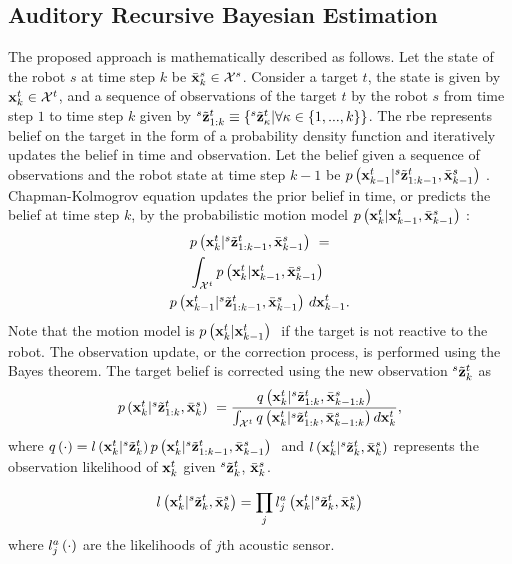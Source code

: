 \documentclass[letterpaper, 10 pt, conference]{ieeeconf}  %
\begin{document}
\subsection{Auditory Recursive Bayesian Estimation}
The proposed approach is mathematically described as follows. Let the state of the robot $s$ at time step $k$ be $\bar {\mathbf{x}}_{k}^{s} \in \mathcal{X}^s$. Consider a target $t$, the state is given by $\mathbf{x}_{k}^{t} \in \mathcal{X}^t$, and a sequence of observations of the target $t$ by the robot $s$ from time step $1$ to time step $k$ given by ${}^{s}\tilde {\mathbf{z}}_{1:k}^{t} \equiv \left \{ {}^{s}\tilde {\mathbf{z}}_{\kappa}^{t}|\forall \kappa \in \left \{ 1,...,k \right \} \right \}$. The \gls{rbe} represents belief on the target in the form of a probability density function and iteratively updates the belief in time and observation.  Let the belief given a sequence of observations and the robot state at time step ${k-1}$ be  $\mbox{$ {p} \left ( \mathbf{x}_{k-1}^{t}|{}^{s}\tilde {\mathbf{z}}_{1:k-1}^{t},\bar {\mathbf{x}}_{k-1}^{s} \right )$ }$.  Chapman-Kolmogrov equation updates the prior belief in time, or predicts the belief at time step $k$, by the probabilistic motion model $\mbox{$ {p} \left ( \mathbf{x}_{k}^{t}|\mathbf{x}_{k-1}^{t},\bar {\mathbf{x}}_{k-1}^{s} \right )$ }$: 
\begin{multline}\label{eq:predictT}
\mbox{$ {p} \left ( \mathbf{x}_{k}^{t}|{}^{s}\tilde {\mathbf{z}}_{1:k-1}^{t},\bar {\mathbf{x}}_{k-1}^{s} \right )$ } =\\ \int_{\mathcal{X}^t} \mbox{$ {p} \left ( \mathbf{x}_{k}^{t}|\mathbf{x}_{k-1}^{t},\bar {\mathbf{x}}_{k-1}^{s} \right )$ } \\  \mbox{$ {p} \left ( \mathbf{x}_{k-1}^{t}|{}^{s}\tilde {\mathbf{z}}_{1:k-1}^{t},\bar {\mathbf{x}}_{k-1}^{s} \right )$ } d\mathbf{x}_{k-1}^{t}.
\end{multline}
Note that the motion model is $\mbox{$ {p} \left ( \mathbf{x}_{k}^{t}|\mathbf{x}_{k-1}^{t} \right )$ }$ if the target is not reactive to the robot.  The observation update, or the correction process, is performed using the Bayes theorem.  The target belief is corrected using the new observation ${}^{s}\tilde {\mathbf{z}}_{k}^{t}$ as
\begin{eqnarray}\label{eq:correctT}
\mbox{$ {p} \left ( \mathbf{x}_{k}^{t}|{}^{s}\tilde {\mathbf{z}}_{1:k}^{t},\bar {\mathbf{x}}_{k}^{s} \right )$ } =  \frac{q \left ( \mathbf{x}_{k}^{t}|{}^{s}\tilde {\mathbf{z}}_{1:k}^{t},\bar {\mathbf{x}}_{k-1:k}^{s} \right )} {\int_{\mathcal{X}^t}
	q \left ( \mathbf{x}_{k}^{t}|{}^{s}\tilde {\mathbf{z}}_{1:k}^{t},\bar {\mathbf{x}}_{k-1:k}^{s} \right ) d\mathbf{x}_{k}^{t}},
\end{eqnarray}
where $q \left ( \cdot \right ) = {l \left ( \mathbf{x}_{k}^{t}|{}^{s}\tilde {\mathbf{z}}_{k}^{t} \right ) \mbox{$ {p} \left ( \mathbf{x}_{k}^{t}|{}^{s}\tilde {\mathbf{z}}_{1:k-1}^{t},\bar {\mathbf{x}}_{k-1}^{s} \right )$ }}$ and $l \left ( \mathbf{x}_{k}^{t}|{}^{s}\tilde {\mathbf{z}}_{k}^{t},\bar {\mathbf{x}}_{k}^{s} \right )$ represents the observation likelihood of $\mathbf{x}_{k}^{t}$ given ${}^{s}\tilde {\mathbf{z}}_{k}^{t}$, $\bar {\mathbf{x}}_{k}^{s}$.  

\begin{eqnarray}\label{eq:joint}
l \left ( \mathbf{x}_{k}^{t}|{}^{s}\tilde {\mathbf{z}}_{k}^{t},\bar {\mathbf{x}}_{k}^{s} \right ) =  \prod_j l_j^{a} \left ( \mathbf{x}_{k}^{t}|{}^{s}\tilde {\mathbf{z}}_{k}^{t},\bar {\mathbf{x}}_{k}^{s} \right ) 
\end{eqnarray}
where $l_j^{a} \left ( \cdot \right )$ are the likelihoods of $j$th acoustic sensor.
\end{document}
